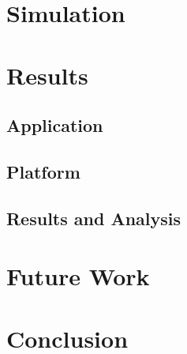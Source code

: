 \documentclass[times, 10pt,twocolumn]{article}
\begin{document}
\section {Simulation}

\section{Results}

\subsection{Application}

\subsection{Platform}

\subsection{Results and Analysis}


\section{Future Work}

\section{Conclusion}




\end{document}
